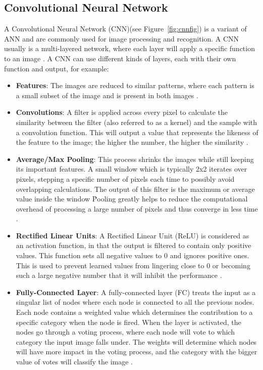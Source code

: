 \subsection{Convolutional Neural Network}\label{sec:Convolutional Neural Network}
A Convolutional Neural Network (CNN)(see Figure~\ref{fig:cnnfig}) is a variant of ANN and are commonly used for image processing and recognition. A CNN usually is a multi-layered network, where each layer will apply a specific function to an image \citep{NIPS2012_4824}. A CNN can use different kinds of layers, each with their own function and output, for example:
\begin{itemize}
	\item\textbf{Features}: The images are reduced to similar patterns, where each pattern is a small subset of the image and is present in both images \citep{rohrer_2016}.
	\item\textbf{Convolutions}: A filter is applied across every pixel to calculate the similarity between the filter (also referred to as a kernel) and the sample with a convolution function. This will output a value that represents the likeness of the feature to the image; the higher the number, the higher the similarity \citep{Alwani:2016:FCA:3195638.3195664}.
	\item\textbf{Average/Max Pooling}: This process shrinks the images while still keeping its important features. A small window which is typically 2x2 iterates over pixels, stepping a specific number of pixels each time to possibly avoid overlapping calculations. The output of this filter is the maximum or average value inside the window \. Pooling greatly helps to reduce the computational overhead of processing a large number of pixels and thus converge in less time \citep{Fei:2018:RSP:3240876.3240919,Ciresan:2011:FHP:2283516.2283603}.
	\item\textbf{Rectified Linear Units}: A Rectified Linear Unit (ReLU) is considered as an activation function, in that the output is filtered to contain only positive values. This function sets all negative values to 0 and ignores positive ones. This is used to prevent learned values from lingering close to 0 or becoming such a large negative number that it will inhibit the performance \citep{Han:2017:DCN:3055635.3056609}.
	\item\textbf{Fully-Connected Layer}: A fully-connected layer (FC) treats the input as a singular list of nodes where each node is connected to all the previous nodes. Each node contains a weighted value which determines the contribution to a specific category when the node is fired. When the layer is activated, the nodes go through a voting process, where each node will vote to which category the input image falls under. The weights will determine which nodes will have more impact in the voting process, and the category with the bigger value of votes will classify the image \citep{Xie:2017:ESA:3160927.3122788}.
	

\end{itemize}

